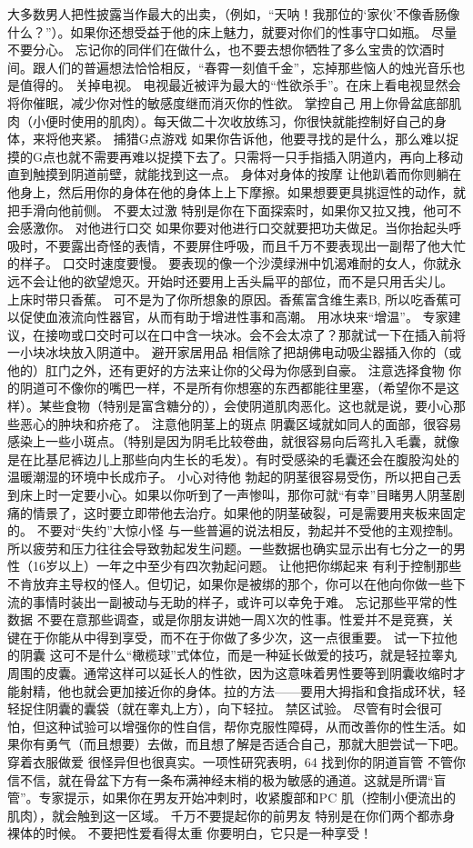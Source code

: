 \documentclass[12pt,UTF8,openany]{ctexbook}
\begin{document}
大多数男人把性披露当作最大的出卖，（例如，“天呐！我那位的‘家伙’不像香肠像什么？”）。如果你还想受益于他的床上魅力，就要对你们的性事守口如瓶。
尽量不要分心。
忘记你的同伴们在做什么，也不要去想你牺牲了多么宝贵的饮酒时间。跟人们的普遍想法恰恰相反，“春霄一刻值千金”，忘掉那些恼人的烛光音乐也是值得的。
关掉电视。
电视最近被评为最大的“性欲杀手”。在床上看电视显然会将你催眠，减少你对性的敏感度继而消灭你的性欲。
掌控自己
用上你骨盆底部肌肉（小便时使用的肌肉）。每天做二十次收放练习，你很快就能控制好自己的身体，来将他夹紧。
捕猎G点游戏
如果你告诉他，他要寻找的是什么，那么难以捉摸的G点也就不需要再难以捉摸下去了。只需将一只手指插入阴道内，再向上移动直到触摸到阴道前壁，就能找到这一点。
身体对身体的按摩
让他趴着而你则躺在他身上，然后用你的身体在他的身体上上下摩擦。如果想要更具挑逗性的动作，就把手滑向他前侧。
不要太过激
特别是你在下面探索时，如果你又拉又拽，他可不会感激你。
对他进行口交
如果你要对他进行口交就要把功夫做足。当你抬起头呼吸时，不要露出奇怪的表情，不要屏住呼吸，而且千万不要表现出一副帮了他大忙的样子。
口交时速度要慢。
要表现的像一个沙漠绿洲中饥渴难耐的女人，你就永远不会让他的欲望熄灭。开始时还要用上舌头扁平的部位，而不是只用舌尖儿。
上床时带只香蕉。
可不是为了你所想象的原因。香蕉富含维生素B, 所以吃香蕉可以促使血液流向性器官，从而有助于增进性事和高潮。
用冰块来“增温”。
专家建议，在接吻或口交时可以在口中含一块冰。会不会太凉了？那就试一下在插入前将一小块冰块放入阴道中。
避开家居用品
相信除了把胡佛电动吸尘器插入你的（或他的）肛门之外，还有更好的方法来让你的父母为你感到自豪。
注意选择食物
你的阴道可不像你的嘴巴一样，不是所有你想塞的东西都能往里塞，（希望你不是这样）。某些食物（特别是富含糖分的），会使阴道肌肉恶化。这也就是说，要小心那些恶心的肿块和疥疮了。
注意他阴茎上的斑点
阴囊区域就如同人的面部，很容易感染上一些小斑点。（特别是因为阴毛比较卷曲，就很容易向后弯扎入毛囊，就像是在比基尼裤边儿上那些向内生长的毛发）。有时受感染的毛囊还会在腹股沟处的温暖潮湿的环境中长成疖子。
小心对待他
勃起的阴茎很容易受伤，所以把自己丢到床上时一定要小心。如果以你听到了一声惨叫，那你可就“有幸”目睹男人阴茎剧痛的情景了，这时要立即带他去治疗。如果他的阴茎破裂，可是需要用夹板来固定的。
不要对“失约”大惊小怪
与一些普遍的说法相反，勃起并不受他的主观控制。所以疲劳和压力往往会导致勃起发生问题。一些数据也确实显示出有七分之一的男性（16岁以上）一年之中至少有四次勃起问题。
让他把你绑起来
有利于控制那些不肯放弃主导权的怪人。但切记，如果你是被绑的那个，你可以在他向你做一些下流的事情时装出一副被动与无助的样子，或许可以幸免于难。
忘记那些平常的性数据
不要在意那些调查，或是你朋友讲她一周X次的性事。性爱并不是竞赛，关键在于你能从中得到享受，而不在于你做了多少次，这一点很重要。
试一下拉他的阴囊
这可不是什么“橄榄球”式体位，而是一种延长做爱的技巧，就是轻拉睾丸周围的皮囊。通常这样可以延长人的性欲，因为这意味着男性要等到阴囊收缩时才能射精，他也就会更加接近你的身体。拉的方法——要用大拇指和食指成环状，轻轻捉住阴囊的囊袋（就在睾丸上方），向下轻拉。
禁区试验。
尽管有时会很可怕，但这种试验可以增强你的性自信，帮你克服性障碍，从而改善你的性生活。如果你有勇气（而且想要）去做，而且想了解是否适合自己，那就大胆尝试一下吧。
穿着衣服做爱
很怪异但也很真实。一项性研究表明，64%
找到你的阴道盲管
不管你信不信，就在骨盆下方有一条布满神经末梢的极为敏感的通道。这就是所谓“盲管”。专家提示，如果你在男友开始冲刺时，收紧腹部和PC 肌（控制小便流出的肌肉），就会触到这一区域。
千万不要提起你的前男友
特别是在你们两个都赤身裸体的时候。
不要把性爱看得太重
你要明白，它只是一种享受！
\end{document}
